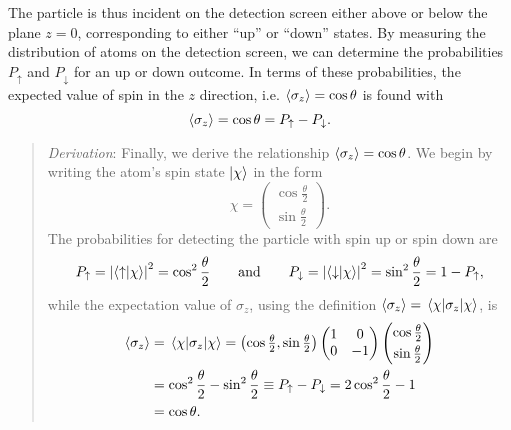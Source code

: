 \documentclass[11pt, a4paper]{article}
\newcommand{\ua}{\uparrow}  %
\newcommand{\da}{\downarrow}  %
\begin{document}
\begin{itemize}
    The particle is thus incident on the detection screen either above or below the  plane $ z = 0 $, corresponding to either ``up'' or ``down'' states. By measuring the distribution of atoms on the detection screen, we can determine the probabilities $ P_{\ua} $ and $ P_{\da} $ for an up or down outcome. In terms of these probabilities, the expected value of spin in the $ z $ direction, i.e. $ \ev{\sigma_{z}} = \cos \theta $ is found with
    \begin{equation*}
        \ev{\sigma_{z}} = \cos \theta = P_{\ua} - P_{\da}.
    \end{equation*}
    \begin{quote}
        \textit{Derivation}: Finally, we derive the relationship $ \ev{\sigma_{z}} = \cos \theta $. We begin by writing the atom's spin state $ \ket{\chi} $ in the form
        \begin{equation*}
            \chi = 
            \begin{pmatrix}
                \cos \frac{\theta}{2}\\[1mm]
                \sin \frac{\theta}{2}
            \end{pmatrix}.
        \end{equation*}
        The probabilities for detecting the particle with spin up or spin down are
        \begin{equation*}
            P_{\ua} = \abs{\braket{\ua}{\chi}}^{2} = \cos^{2}\frac{\theta}{2} \qquad \text{and} \qquad P_{\da} = \abs{\braket{\da}{\chi}}^{2} = \sin^{2} \frac{\theta}{2} = 1 - P_{\ua},
        \end{equation*}
        while the expectation value of $ \sigma_{z} $, using the definition $ \ev{\sigma_{z}} = \mel{\chi}{\sigma_{z}}{\chi} $, is
        \begin{align*}
            \ev{\sigma_{z}} &= \mel{\chi}{\sigma_{z}}{\chi} = 
            \left( \cos \tfrac{\theta}{2}, \sin \tfrac{\theta}{2} \right) 
            \begin{pmatrix}
                1 & 0\\
                0 & -1
            \end{pmatrix}
            \begin{pmatrix}
                \cos \frac{\theta}{2}\\[1mm]
                \sin \frac{\theta}{2}
            \end{pmatrix}\\
            & = \cos^{2} \frac{\theta}{2} - \sin^{2} \frac{\theta}{2} \equiv P_{\ua} - P_{\da} = 2 \cos^{2} \frac{\theta}{2} - 1\\
            & = \cos \theta.
        \end{align*}
 
    \end{quote}
    
                
    
\end{itemize}
\end{document}
